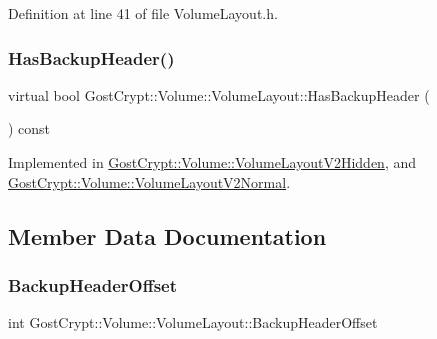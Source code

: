Definition at line 41 of file Volume\+Layout.\+h.

\mbox{\label{class_gost_crypt_1_1_volume_1_1_volume_layout_a4f88c450f745ca0da3d74700b89d5756}} 
\subsubsection{\texorpdfstring{Has\+Backup\+Header()}{HasBackupHeader()}}
{\footnotesize\ttfamily virtual bool Gost\+Crypt\+::\+Volume\+::\+Volume\+Layout\+::\+Has\+Backup\+Header (\begin{DoxyParamCaption}{ }\end{DoxyParamCaption}) const\hspace{0.3cm}{\ttfamily [pure virtual]}}



Implemented in \hyperlink{class_gost_crypt_1_1_volume_1_1_volume_layout_v2_hidden_a6e62bb62c0d5747e089658516d443706}{Gost\+Crypt\+::\+Volume\+::\+Volume\+Layout\+V2\+Hidden}, and \hyperlink{class_gost_crypt_1_1_volume_1_1_volume_layout_v2_normal_a18a75c3663f6922e890dca6825c0b580}{Gost\+Crypt\+::\+Volume\+::\+Volume\+Layout\+V2\+Normal}.



\subsection{Member Data Documentation}
\mbox{\label{class_gost_crypt_1_1_volume_1_1_volume_layout_a298446dedd1daaca3ce06bbe7edfdd03}} 
\subsubsection{\texorpdfstring{Backup\+Header\+Offset}{BackupHeaderOffset}}
{\footnotesize\ttfamily int Gost\+Crypt\+::\+Volume\+::\+Volume\+Layout\+::\+Backup\+Header\+Offset\hspace{0.3cm}{\ttfamily [protected]}}



